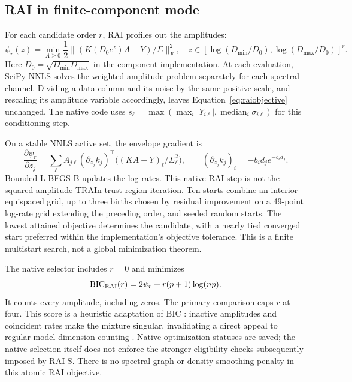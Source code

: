 \subsection{RAI in finite-component mode}\label{sec:raiatomic}
For each candidate order $r$, RAI profiles out the amplitudes:
\begin{equation}\label{eq:raiobjective}
 \psi_r(z)=\min_{A\geq0}\frac12\|(K(D_0e^z)A-Y)/\Sigma\|_F^2,
 \quad z\in[\log(D_{\min}/D_0),\log(D_{\max}/D_0)]^r.
\end{equation}
Here $D_0=\sqrt{D_{\min}D_{\max}}$ in the component implementation. At each evaluation, SciPy NNLS solves the weighted amplitude problem separately for each spectral channel. Dividing a data column and its noise by the same positive scale, and rescaling its amplitude variable accordingly, leaves Equation~\eqref{eq:raiobjective} unchanged. The native code uses $s_\ell=\max(\max_i|Y_{i\ell}|,\operatorname{median}_i\sigma_{i\ell})$ for this conditioning step.

On a stable NNLS active set, the envelope gradient is
\begin{equation}\label{eq:raigradient}
 \frac{\partial\psi_r}{\partial z_j}
 =\sum_\ell A_{j\ell}(\partial_{z_j}k_j)^\top
       \bigl((K A-Y)_\ell/\Sigma_\ell^2\bigr),
 \qquad (\partial_{z_j}k_j)_i=-b_i d_j e^{-b_id_j}.
\end{equation}
Bounded L-BFGS-B updates the log rates. This native RAI step is not the squared-amplitude TRAIn trust-region iteration. Ten starts combine an interior equispaced grid, up to three births chosen by residual improvement on a 49-point log-rate grid extending the preceding order, and seeded random starts. The lowest attained objective determines the candidate, with a nearly tied converged start preferred within the implementation's objective tolerance. This is a finite multistart search, not a global minimization theorem.

The native selector includes $r=0$ and minimizes
\begin{equation}\label{eq:raibic}
 \mathrm{BIC}_{\rm RAI}(r)=2\psi_r+r(p+1)\log(np).
\end{equation}
It counts every amplitude, including zeros. The primary comparison caps $r$ at four. This score is a heuristic adaptation of BIC \cite{schwarz}: inactive amplitudes and coincident rates make the mixture singular, invalidating a direct appeal to regular-model dimension counting \cite{watanabe}. Native optimization statuses are saved; the native selection itself does not enforce the stronger eligibility checks subsequently imposed by RAI-S. There is no spectral graph or density-smoothing penalty in this atomic RAI objective.

